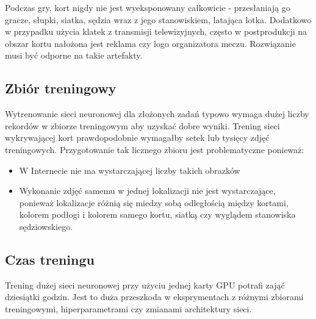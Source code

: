 Podczas gry, kort nigdy nie jest wyeksponowany całkowicie - przesłaniają go gracze, słupki, siatka, sędzia wraz z jego stanowiskiem, latająca lotka. Dodatkowo w przypadku użycia klatek z transmisji telewizyjnych, często w postprodukcji na obszar kortu nałożona jest reklama czy logo organizatora meczu. Rozwiązanie musi być odporne na takie artefakty.

\subsection*{Zbiór treningowy}

Wytrenowanie sieci neuronowej dla złożonych zadań typowo wymaga dużej liczby rekordów w zbiorze treningowym aby uzyskać dobre wyniki. Trening sieci wykrywającej kort prawdopodobnie wymagałby setek lub tysięcy zdjęć treningowych. Przygotowanie tak licznego zbioru jest problematyczne ponieważ:

\begin{itemize}
	\item W Internecie nie ma wystarczającej liczby takich obrazków
	\item Wykonanie zdjęć samemu w jednej lokalizacji nie jest wystarczające, ponieważ lokalizacje różnią się miedzy sobą odległością między kortami, kolorem podłogi i kolorem samego kortu, siatką czy wyglądem stanowiska sędziowskiego.
\end{itemize}

\subsection*{Czas treningu}

Trening dużej sieci neuronowej przy użyciu jednej karty GPU potrafi zająć dziesiątki godzin. Jest to duża przeszkoda w eksprymentach z różnymi zbiorami treningowymi, hiperparametrami czy zmianami architektury sieci.

